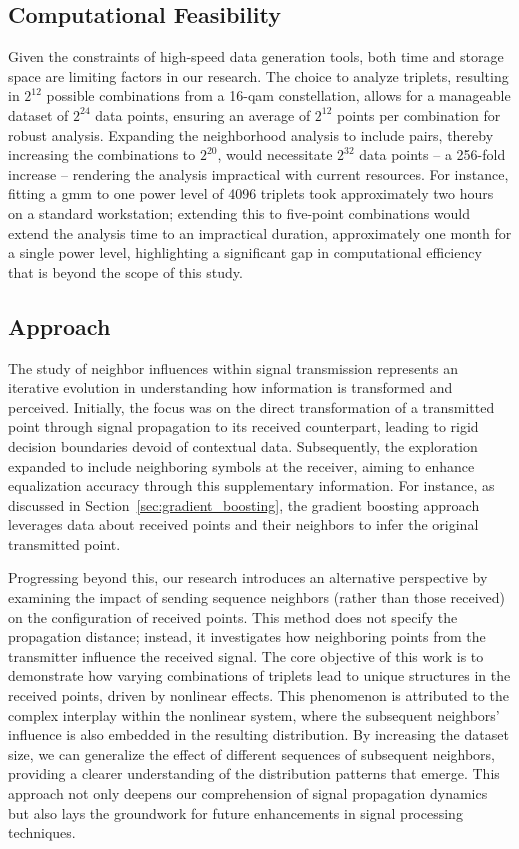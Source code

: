 \subsection{Computational Feasibility}
Given the constraints of high-speed data generation tools, both time and storage space are limiting factors in our research. The choice to analyze triplets, resulting in $2^{12}$ possible combinations from a 16-\acrshort{qam} constellation, allows for a manageable dataset of $2^{24}$ data points, ensuring an average of $2^{12}$ points per combination for robust analysis. Expanding the neighborhood analysis to include pairs, thereby increasing the combinations to $2^{20}$, would necessitate $2^{32}$ data points -- a 256-fold increase -- rendering the analysis impractical with current resources. For instance, fitting a \acrshort{gmm} to one power level of 4096 triplets took approximately two hours on a standard workstation; extending this to five-point combinations would extend the analysis time to an impractical duration, approximately one month for a single power level, highlighting a significant gap in computational efficiency that is beyond the scope of this study.

\subsection{Approach}
The study of neighbor influences within signal transmission represents an iterative evolution in understanding how information is transformed and perceived. Initially, the focus was on the direct transformation of a transmitted point through signal propagation to its received counterpart, leading to rigid decision boundaries devoid of contextual data. Subsequently, the exploration expanded to include neighboring symbols at the receiver, aiming to enhance equalization accuracy through this supplementary information. For instance, as discussed in Section~\ref{sec:gradient_boosting}, the gradient boosting approach leverages data about received points and their neighbors to infer the original transmitted point.

Progressing beyond this, our research introduces an alternative perspective by examining the impact of sending sequence neighbors (rather than those received) on the configuration of received points. This method does not specify the propagation distance; instead, it investigates how neighboring points from the transmitter influence the received signal. The core objective of this work is to demonstrate how varying combinations of triplets lead to unique structures in the received points, driven by nonlinear effects. This phenomenon is attributed to the complex interplay within the nonlinear system, where the subsequent neighbors' influence is also embedded in the resulting distribution. By increasing the dataset size, we can generalize the effect of different sequences of subsequent neighbors, providing a clearer understanding of the distribution patterns that emerge. This approach not only deepens our comprehension of signal propagation dynamics but also lays the groundwork for future enhancements in signal processing techniques.


